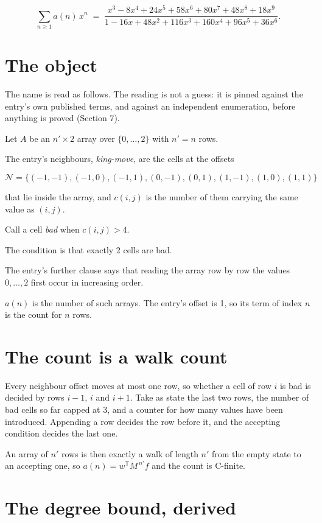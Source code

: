 \documentclass[11pt]{article}
\theoremstyle{definition}
\begin{document}
\[\sum_{n \ge 1} a(n)\,x^n \;=\; \frac{x^{3} - 8x^{4} + 24x^{5} + 58x^{6} + 80x^{7} + 48x^{8} + 18x^{9}}{1 - 16x + 48x^{2} + 116x^{3} + 160x^{4} + 96x^{5} + 36x^{6}}.\]

\section{The object}

The name is read as follows. The reading is not a guess: it is pinned against the entry's own published terms, and against an independent enumeration, before anything is proved (Section 7).

Let $A$ be an $n' \times 2$ array over $\{0,\dots,2\}$ with $n' = n$ rows.

The entry's neighbours, {\itshape king-move}, are the cells at the offsets

\[\mathcal{N} = \{(-1,-1), (-1,0), (-1,1), (0,-1), (0,1), (1,-1), (1,0), (1,1)\}\]

that lie inside the array, and $c(i,j)$ is the number of them carrying the same value as $(i,j)$.

Call a cell {\itshape bad} when $c(i,j) > 4$.

The condition is that exactly 2 cells are bad.

The entry's further clause says that reading the array row by row the values $0,\dots,2$ first occur in increasing order.

$a(n)$ is the number of such arrays. The entry's offset is 1, so its term of index $n$ is the count for $n$ rows.

\section{The count is a walk count}

Every neighbour offset moves at most one row, so whether a cell of row $i$ is bad is decided by rows $i-1$, $i$ and $i+1$. Take as state the last two rows, the number of bad cells so far capped at 3, and a counter for how many values have been introduced. Appending a row decides the row before it, and the accepting condition decides the last one.

An array of $n'$ rows is then exactly a walk of length $n'$ from the empty state to an accepting one, so $a(n) = w^{\mathsf T}M^{\,n'}f$ and the count is C-finite.

\section{The degree bound, derived}
\end{document}
